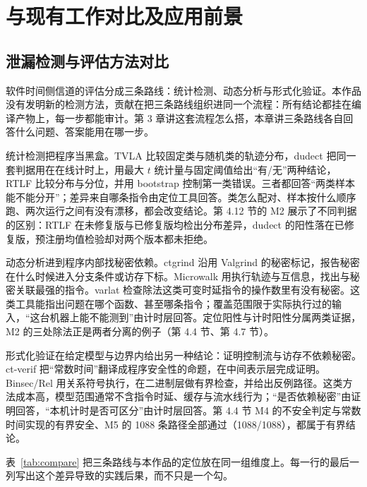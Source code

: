 
\section{与现有工作对比及应用前景}

\subsection{泄漏检测与评估方法对比}

软件时间侧信道的评估分成三条路线：统计检测、动态分析与形式化验证。本作品没有发明新的检测方法，贡献在把三条路线组织进同一个流程：所有结论都挂在编译产物上，每一步都能审计。第 3 章讲这套流程怎么搭，本章讲三条路线各自回答什么问题、答案能用在哪一步。

统计检测把程序当黑盒。TVLA\cite{tvla} 比较固定类与随机类的轨迹分布，dudect\cite{dudect} 把同一套判据用在在线计时上，用最大 $t$ 统计量与固定阈值给出“有/无”两种结论，RTLF\cite{rtlf} 比较分布与分位，并用 bootstrap 控制第一类错误。三者都回答“两类样本能不能分开”；差异来自哪条指令由定位工具回答。类怎么配对、样本按什么顺序跑、两次运行之间有没有漂移，都会改变结论。第 4.12 节的 M2 展示了不同判据的区别：RTLF 在未修复版与已修复版均检出分布差异，dudect 的阳性落在已修复版，预注册均值检验却对两个版本都未拒绝。

动态分析进到程序内部找秘密依赖。ctgrind 沿用 Valgrind 的秘密标记，报告秘密在什么时候进入分支条件或访存下标\cite{ctgrind}。Microwalk 用执行轨迹与互信息，找出与秘密关联最强的指令\cite{microwalk}。varlat 检查除法这类可变时延指令的操作数里有没有秘密\cite{kyberslash}。这类工具能指出问题在哪个函数、甚至哪条指令；覆盖范围限于实际执行过的输入，“这台机器上能不能测到”由计时层回答。定位阳性与计时阳性分属两类证据，M2 的三处除法正是两者分离的例子（第 4.4 节、第 4.7 节）。

形式化验证在给定模型与边界内给出另一种结论：证明控制流与访存不依赖秘密。ct-verif 把“常数时间”翻译成程序安全性的命题，在中间表示层完成证明\cite{ctverif}。Binsec/Rel 用关系符号执行，在二进制层做有界检查，并给出反例路径\cite{binsec}。这类方法成本高，模型范围通常不含指令时延、缓存与流水线行为；“是否依赖秘密”由证明回答，“本机计时是否可区分”由计时层回答。第 4.4 节 M4 的不安全判定与常数时间实现的有界安全、M5 的 1088 条路径全部通过（1088/1088），都属于有界结论。

表~\ref{tab:compare} 把三条路线与本作品的定位放在同一组维度上。每一行的最后一列写出这个差异导致的实践后果，而不只是一个勾。

